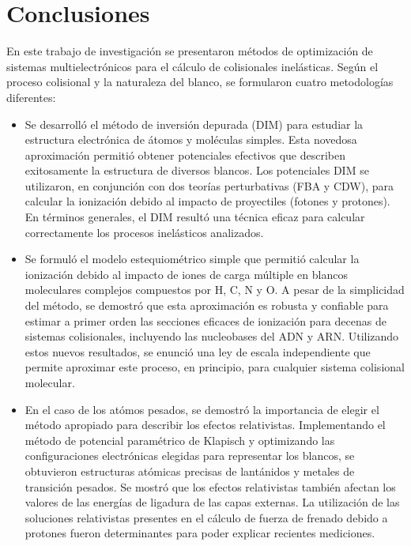 \chapter*{Conclusiones}%
%

En este trabajo de investigación se presentaron métodos de 
optimización de sistemas multielectrónicos para el cálculo de 
colisionales inelásticas. Según el proceso colisional y la naturaleza 
del blanco, se formularon cuatro metodologías diferentes:
\begin{itemize}
\item 
Se desarrolló el método de inversión depurada (DIM) para estudiar la 
estructura electrónica de átomos y moléculas simples. Esta novedosa 
aproximación permitió obtener potenciales efectivos que describen 
exitosamente la estructura de diversos blancos. Los potenciales DIM se 
utilizaron, en conjunción con dos teorías perturbativas (FBA y CDW), 
para calcular la ionización debido al impacto de proyectiles (fotones y 
protones). En términos generales, el DIM resultó una técnica eficaz para 
calcular correctamente los procesos inelásticos analizados.

\item
Se formuló el modelo estequiométrico simple que permitió calcular la 
ionización debido al impacto de iones de carga múltiple en blancos 
moleculares complejos compuestos por H, C, N y O. A pesar de la 
simplicidad del método, se demostró que esta aproximación es robusta y 
confiable para estimar a primer orden las secciones eficaces de 
ionización para decenas de sistemas colisionales, incluyendo las 
nucleobases del ADN y ARN. Utilizando estos nuevos resultados, se 
enunció una ley de escala independiente que permite aproximar este 
proceso, en principio, para cualquier sistema colisional molecular.

\item
En el caso de los atómos pesados, se demostró la importancia de elegir el 
método apropiado para describir los efectos relativistas. Implementando 
el método de potencial paramétrico de Klapisch y optimizando las 
configuraciones electrónicas elegidas para representar los blancos, se 
obtuvieron estructuras atómicas precisas de lantánidos y metales de 
transición pesados. Se mostró que los efectos relativistas también 
afectan los valores de las energías de ligadura de las capas externas. 
La utilización de las soluciones relativistas presentes en el cálculo de 
fuerza de frenado debido a protones fueron determinantes para poder 
explicar recientes mediciones.


\end{itemize}
